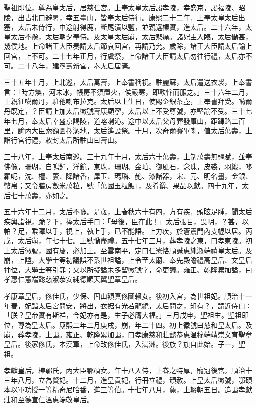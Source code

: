 \begin{pinyinscope}
聖祖即位，尊為皇太后，居慈仁宮。上奉太皇太后謁孝陵，幸盛京，謁福陵、昭陵，出古北口避暑，幸五臺山，皆奉太后侍行。康熙二十二年，上奉太皇太后出塞，太后未侍行，中途射得鹿，斷尾漬以鹽，並親選榛實，進太后。二十六年，太皇太后不豫，太后朝夕奉侍。及太皇太后崩，太后悲痛。諸妃主入臨，太后慟甚，幾僕地。上命諸王大臣奏請太后節哀回宮，再請乃允。歲除，諸王大臣請太后諭上回宮，上不可。二十七年正月，行虞祭，上命諸王大臣請太后勿往行禮，太后亦不可。二十八年，建寧壽新宮，奉太后居焉。

三十五年十月，上北巡，太后萬壽，上奉書稱祝。駐麗蘇，太后遣送衣裘，上奉書言：「時方燠，河未冰，帳房不須置火，俟嚴寒，即歡忭而服之。」三十六年二月，上親征噶爾丹，駐他喇布拉克。太后以上生日，使賜金銀茶壺，上奉書拜受。噶爾丹既定，？臣請上加太后徽號壽康顯寧，太后以上不受尊號，亦堅諭不受。三十七年七月，奉太后幸盛京謁陵，道喀喇沁。途中以太后父母葬發庫山，距蹕路二百里，諭內大臣索額圖擇潔地，太后遙設祭。十月，次奇爾賽畢喇，值太后萬壽，上詣行宮行禮，敕封太后所駐山曰壽山。

三十八年，上奉太后南巡。三十九年十月，太后六十萬壽，上制萬壽無疆賦，並奉佛像，珊瑚，自鳴鐘，洋鏡，東珠，珊瑚、金珀、御風石，念珠，皮裘，羽緞，哆羅呢，沈、檀、蕓、降諸香，犀玉、瑪瑙、赩、漆諸器，宋、元、明名畫，金銀、幣帛；又令膳房數米萬粒，號「萬國玉粒飯」，及肴饌、果品以獻。四十九年，太后七十萬壽，亦如之。

五十六年十二月，太后不豫。是歲，上春秋六十有四，方有疾，頭眩足腫，聞太后疾輿詣視，跪？下，捧太后手曰：「母後，臣在此！」太后張目，畏明，？甚，以帕？足，乘障以手，視上，執上手，已不能語。上力疾，於蒼震門內支幄以居。丙戌，太后崩，年七十七。上號慟盡禮。五十七年三月，葬孝陵之東，曰孝東陵。初上太后徽號，國有慶，必加上。至雲南平，定曰仁憲恪順誠惠純淑端禧皇太后。及崩，上謚，大學士等初議誤不系世祖謚，上令至太廟、奉先殿瞻禮高皇后、文皇后神位，大學士等引罪；又以所擬謚未多留徽號字，命更議。雍正、乾隆累加謚，曰孝惠仁憲端懿慈淑恭安純德順天翼聖章皇后。

孝康章皇后，佟佳氏，少保、固山額真佟圖賴女。後初入宮，為世祖妃。順治十一年春，妃詣太后宮問安，將出，衣裾有光若龍繞，太后問之，知有？，謂近侍曰：「朕？皇帝實有斯祥，今妃亦有是，生子必膺大福。」三月戊申，聖祖生。聖祖即位，尊為皇太后。康熙二年二月庚戌，崩，年二十四。初上徽號曰慈和皇太后。及崩，葬孝陵，上謚。雍正、乾隆累加謚，曰孝康慈和莊懿恭惠溫穆端靖崇文育聖章皇后。後家佟氏，本漢軍，上命改佟佳氏，入滿洲。後族？旗自此始。子一，聖祖。

孝獻皇后，棟鄂氏，內大臣鄂碩女。年十八入侍，上眷之特厚，寵冠後宮。順治十三年八月，立為賢妃。十二月，進皇貴妃，行冊立禮，頒赦。上皇太后徽號，鄂碩本以軍功授一等精奇尼哈番，進三等伯。十七年八月，薨，上輟朝五日。追謚孝獻莊和至德宣仁溫惠端敬皇后。


\end{pinyinscope}
